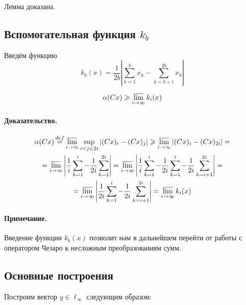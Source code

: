 Лемма доказана.

\subsection{Вспомогательная функция $k_b$}

Введём функцию
\begin{equation}\label{def_k_b}
	k_b(x) = \frac{1}{2b}\left|
		\sum_{k=1}^{b}x_k - \sum_{k=b+1}^{2b}x_k
	\right|
\end{equation}

\begin{lemma}
	\begin{equation}\label{alpha_greater_k_b}
		\alpha (Cx) \geq \varlimsup_{i\to \infty} k_i(x)
	\end{equation}
\end{lemma}

\paragraph{Доказательство.}

\begin{multline*}
	\alpha (Cx) \mathop{=}\limits^{def}
	\varlimsup_{i\to \infty} \sup_{i<j\leq 2i} |(Cx)_i - (Cx)_j| \geq
	\varlimsup_{i\to \infty} |(Cx)_i - (Cx)_{2i}| =
	\\ =
	\varlimsup_{i\to \infty} \left|\frac{1}{i}\sum_{k=1}^i  - \frac{1}{2i}\sum_{k=1}^{2i} \right| =
	\varlimsup_{i\to \infty} \left|\frac{1}{i}\sum_{k=1}^i  - \frac{1}{2i}\sum_{k=1}^{i}- \frac{1}{2i}\sum_{k=i+1}^{2i}\right| =
	\\=
	\varlimsup_{i\to \infty} \left|\frac{1}{2i}\sum_{k=1}^i - \frac{1}{2i}\sum_{k=i+1}^{2i}\right| =
	\varlimsup_{i\to \infty} k_i(x)
\end{multline*}

\paragraph{Примечание.}
Введение функции $k_b(x)$ позволит нам в дальнейшем перейти от работы с оператором Чезаро
к несложным преобразованиям сумм.



\subsection{Основные построения}

Построим вектор $y\in \ell_\infty$ следующим образом:


